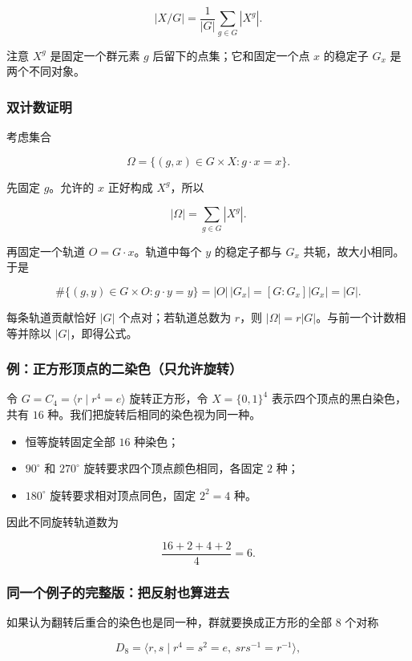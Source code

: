 \[
|X/G|=\frac{1}{|G|}\sum_{g\in G}|X^g|.
\]

注意 $X^g$ 是固定一个群元素 $g$ 后留下的点集；它和固定一个点 $x$ 的稳定子 $G_x$ 是两个不同对象。

\subsubsection{双计数证明}


考虑集合

\[
\Omega=\{(g,x)\in G\times X:g\cdot x=x\}.
\]

先固定 $g$。允许的 $x$ 正好构成 $X^g$，所以

\[
|\Omega|=\sum_{g\in G}|X^g|.
\]

再固定一个轨道 $O=G\cdot x$。轨道中每个 $y$ 的稳定子都与 $G_x$ 共轭，故大小相同。于是

\[
\#\{(g,y)\in G\times O:g\cdot y=y\}
=|O|\,|G_x|
=[G:G_x]|G_x|=|G|.
\]

每条轨道贡献恰好 $|G|$ 个点对；若轨道总数为 $r$，则 $|\Omega|=r|G|$。与前一个计数相等并除以 $|G|$，即得公式。

\subsubsection{例：正方形顶点的二染色（只允许旋转）}


令 $G=C_4=\langle r\mid r^4=e\rangle$ 旋转正方形，令 $X=\{0,1\}^4$ 表示四个顶点的黑白染色，共有 $16$ 种。我们把旋转后相同的染色视为同一种。

\begin{itemize}
\item 恒等旋转固定全部 $16$ 种染色；
\item $90^\circ$ 和 $270^\circ$ 旋转要求四个顶点颜色相同，各固定 $2$ 种；
\item $180^\circ$ 旋转要求相对顶点同色，固定 $2^2=4$ 种。
\end{itemize}


因此不同旋转轨道数为

\[
\frac{16+2+4+2}{4}=6.
\]

\subsubsection{同一个例子的完整版：把反射也算进去}


如果认为翻转后重合的染色也是同一种，群就要换成正方形的全部 $8$ 个对称

\[
D_8=\langle r,s\mid r^4=s^2=e,\ srs^{-1}=r^{-1}\rangle,
\]


